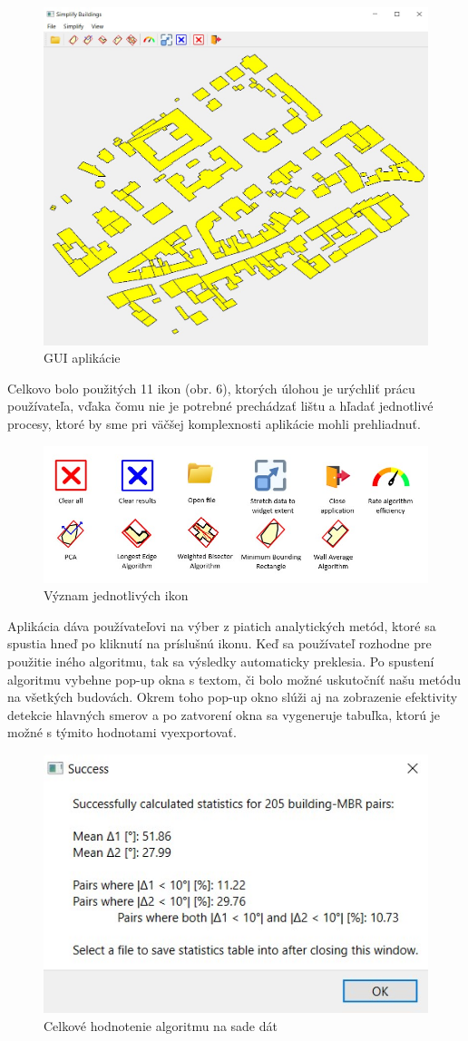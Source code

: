 \documentclass[12pt]{article}
\begin{document}
\begin{figure} [h]
    \centering
    \includegraphics[width=0.5\linewidth]{latex/image/apka.jpg}
    \caption{GUI aplikácie}
    \label{fig:enter-label}
\end{figure}
Celkovo bolo použitých 11 ikon (obr. 6), ktorých úlohou je urýchliť prácu používateľa, 
vďaka čomu nie je potrebné prechádzať lištu a hľadať jednotlivé procesy, ktoré by sme pri 
väčšej komplexnosti aplikácie mohli prehliadnuť. \\

\begin{figure}[h]
    \centering
    \includegraphics[width=0.7\linewidth]{latex/image/icons.jpg}
    \caption{Význam jednotlivých ikon}
    \label{fig:enter-label}
\end{figure}
Aplikácia dáva používateľovi na výber z piatich analytických metód, ktoré sa spustia 
hneď po kliknutí na príslušnú ikonu. Keď sa používateľ rozhodne pre použitie iného algoritmu, tak sa výsledky automaticky preklesia. Po spustení algoritmu vybehne  pop-up okna s textom, či bolo možné uskutočníť našu metódu na všetkých budovách. Okrem toho pop-up okno slúži aj na zobrazenie efektivity detekcie hlavných smerov a po zatvorení okna sa vygeneruje tabuľka, ktorú je možné s týmito hodnotami vyexportovať.  


\begin{figure}[h]
    \centering
    \includegraphics[width=0.5\linewidth]{latex/image/success.jpg}
    \caption{Celkové hodnotenie algoritmu na sade dát}
    \label{fig:enter-label}
\end{figure}
\end{document}
